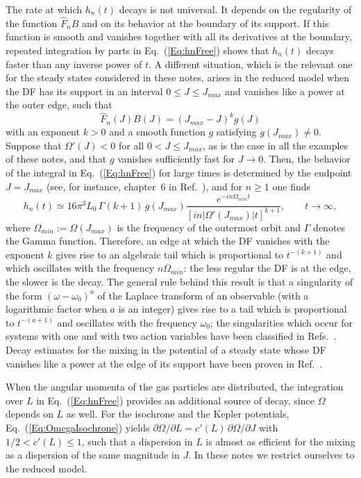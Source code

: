 The rate at which $h_n(t)$ decays is not universal. It depends on the regularity of the function $\hat{F}_n B$ and on its behavior at the boundary of its support. If this function is smooth and vanishes together with all its derivatives at the boundary, repeated integration by parts in Eq.~(\ref{Eq:hnFree}) shows that $h_n(t)$ decays faster than any inverse power of $t$. A different situation, which is the relevant one for the steady states considered in these notes, arises in the reduced model when the DF has its support in an interval $0\leq J\leq J_{max}$ and vanishes like a power at the outer edge, such that
\begin{equation}
\hat{F}_n(J) B(J) = (J_{max} - J)^k g(J)
\label{Eq:EdgeBehavior}
\end{equation}
with an exponent $k > 0$ and a smooth function $g$ satisfying $g(J_{max})\neq 0$. Suppose that $\Omega'(J) < 0$ for all $0 < J\leq J_{max}$, as is the case in all the examples of these notes, and that $g$ vanishes sufficiently fast for $J\to 0$. Then, the behavior of the integral in Eq.~(\ref{Eq:hnFree}) for large times is determined by the endpoint $J = J_{max}$ (see, for instance, chapter~6 in Ref.~\cite{BenderOrszag-Book}), and for $n\geq 1$ one finds
\begin{equation}
h_n(t)\simeq 16\pi^3 L_0\,\Gamma(k+1)\, g(J_{max})\frac{e^{-in\Omega_{min} t}}{\left[ i n |\Omega'(J_{max})| t \right]^{k+1}},\qquad t\to \infty,
\label{Eq:Tail}
\end{equation}
where $\Omega_{min} := \Omega(J_{max})$ is the frequency of the outermost orbit and $\Gamma$ denotes the Gamma function. Therefore, an edge at which the DF vanishes with the exponent $k$ gives rise to an algebraic tail which is proportional to $t^{-(k+1)}$ and which oscillates with the frequency $n\Omega_{min}$: the less regular the DF is at the edge, the slower is the decay. The general rule behind this result is that a singularity of the form $(\omega - \omega_0)^a$ of the Laplace transform of an observable (with a logarithmic factor when $a$ is an integer) gives rise to a tail which is proportional to $t^{-(a+1)}$ and oscillates with the frequency $\omega_0$; the singularities which occur for systems with one and with two action variables have been classified in Refs.~\cite{jBaOyY11,jByY13}. Decay estimates for the mixing in the potential of a steady state whose DF vanishes like a power at the edge of its support have been proven in Ref.~\cite{mHgRmScS24}.

When the angular momenta of the gas particles are distributed, the integration over $L$ in Eq.~(\ref{Eq:hnFree}) provides an additional source of decay, since $\Omega$ depends on $L$ as well. For the isochrone and the Kepler potentials, Eq.~(\ref{Eq:OmegaIsochrone}) yields $\partial\Omega/\partial L = c'(L)\,\partial\Omega/\partial J$ with $1/2 < c'(L)\leq 1$, such that a dispersion in $L$ is almost as efficient for the mixing as a dispersion of the same magnitude in $J$. In these notes we restrict ourselves to the reduced model.


